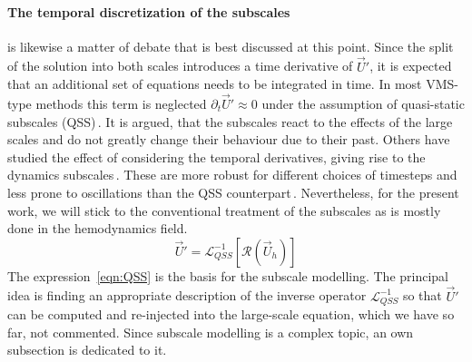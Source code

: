 \paragraph{The temporal discretization of the subscales} is likewise a matter of debate that is best discussed at this point. Since the split of the solution into both scales introduces a time derivative of $\vec{U}'$, it is expected that an additional set of equations needs to be integrated in time. In most VMS-type methods this term is neglected $\partial_t\vec{U}'\approx0$ under the assumption of quasi-static subscales (QSS)\,\cite{Tezduyar2000, Bazilevs2007, Masud2011}. It is argued, that the subscales react to the effects of the large scales and do not greatly change their behaviour due to their past. Others have studied the effect of considering the temporal derivatives, giving rise to the dynamics subscales\,\cite{Codina2002, Codina2007}. These are more robust for different choices of timesteps and less prone to oscillations than the QSS counterpart\,\cite{Gonzalez2022}. Nevertheless, for the present work, we will stick to the conventional treatment of the subscales as is mostly done in the hemodynamics field.
\begin{equation}
	\vec{U}' = \mathcal{L}^{-1}_{QSS}[\mathcal{R}(\vec{U}_h)]
	\label{eqn:QSS}
\end{equation}
The expression \,\eqref{eqn:QSS} is the basis for the subscale modelling. The principal idea is finding an appropriate description of the inverse operator $\mathcal{L}^{-1}_{QSS}$ so that $\vec{U}'$ can be computed and re-injected into the large-scale equation, which we have so far, not commented. Since subscale modelling is a complex topic, an own subsection is dedicated to it.

